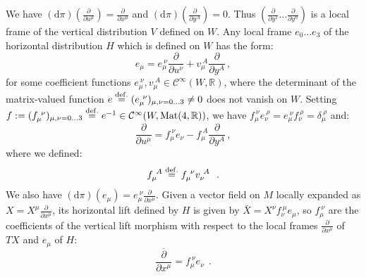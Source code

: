 \documentclass[10pt, cmp, numbook, final, a4paper]{svjour}
\newcommand{\eqdef}{\stackrel{{\rm def.}}{=}}
\def\R{\mathbb{R}}
\def\dd{\mathrm{d}}
\newcommand{\be}{\begin{equation*}}
\newcommand{\ee}{\end{equation*}}
\newcommand{\ben}{\begin{equation}}
\newcommand{\een}{\end{equation}}
\def\cC{{\mathcal C}}
\def\cC{\mathcal{C}}
\begin{document}
We have $(\dd \pi)(\frac{\partial}{\partial
u^\mu})=\frac{\partial}{\partial x^\mu}$ and
$(\dd\pi)(\frac{\partial}{\partial y^A})=0$. Thus
$(\frac{\partial}{\partial y^1}\ldots \frac{\partial}{\partial y^n})$
is a local frame of the vertical distribution $V$ defined on $W$. Any
local frame $e_0\ldots e_3$ of the horizontal distribution $H$ which
is defined on $W$ has the form:
\ben
\label{e}
e_\mu=e_\mu^{~\nu}\frac{\partial}{\partial u^\nu}+v_\mu^{~A} \frac{\partial}{\partial y^A}\, ,
\een
for some coefficient functions $e_\mu^{~\nu},
v_\mu^{~A}\in\cC^\infty(W,\R)$, where the determinant of the
matrix-valued function $e \eqdef (e_\mu^{~\nu})_{\mu,\nu=0\ldots
3}\neq 0$ does not vanish on $W$. Setting
$f:=(f_\mu^{~\nu})_{\mu,\nu=0\ldots 3}\eqdef
e^{-1}\in \cC^\infty(W,\mathrm{Mat}(4,\R))$, we have
$f_{\mu}^{~\nu}e_{\nu}^{~\rho}=e_{\mu}^{~\nu}f_\nu^{~\rho}=\delta_\mu^{~\rho}$
and:
\ben
\label{f}
\frac{\partial}{\partial u^\mu}=f_{\mu}^{~\nu}e_\nu-f_\mu^{~A} \frac{\partial}{\partial y^A}\, ,
\een
where we defined: 
\be
f_\mu^{~A}\eqdef f_{\mu}^{~\nu} v_\nu^{~A}~~.
\ee
We also have $(\dd \pi)(e_\mu)=e_\mu^{~\nu}\frac{\partial}{\partial
  x^\mu}$. Given a vector field on $M$ locally expanded as $X=X^\mu
\frac{\partial}{\partial x^\mu}$, its horizontal lift defined by $H$
is given by ${\bar X}= X^\nu f_\nu^{~\mu} e_\mu$, so $f_\mu^{~\nu}$
are the coefficients of the vertical lift morphism with respect to the
local frames $\frac{\partial}{\partial x^\mu}$ of $TX$ and $e_\mu$ of
$H$:
\be
\overline{\frac{\partial}{\partial x^\mu}}=f_\mu^{~\nu}e_\nu~~.
\ee 
\end{document}
